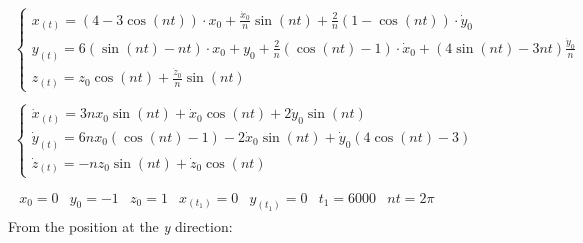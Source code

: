 \documentclass[11pt, a4paper]{article}
\begin{document}
\begin{equation}
    \begin{matrix}
        \left\{\begin{array}{l}
            \displaystyle x_{(t)} = \left(4-3\cos(nt)\right)\cdot x_0 + \frac{\dot{x}_0}{n}\sin(nt)+\frac{2}{n}\left(1-\cos(nt)\right)\cdot\dot{y}_0 \\
            \displaystyle y_{(t)} = 6\left(\sin(nt)-nt\right)\cdot x_0 + y_0 + \frac{2}{n}\left(\cos(nt)-1\right)\cdot\dot{x}_0 + \left(4\sin(nt)-3nt\right)\frac{\dot{y}_0}{n} \\
            \displaystyle z_{(t)}=z_0\cos(nt)+\frac{\dot{z}_0}{n}\sin(nt)
        \end{array}\right. \\\\
        \left\{\begin{array}{l}
            \displaystyle\dot{x}_{(t)} = 3nx_0\sin(nt) + \dot{x}_0\cos(nt) +2\dot{y}_0\sin(nt) \\
            \displaystyle\dot{y}_{(t)} = 6nx_0\left(\cos(nt)-1\right) -2\dot{x}_0\sin(nt) + \dot{y}_0\left(4\cos(nt)-3\right) \\
            \dot{z}_{(t)} = -nz_0\sin(nt)+\dot{z}_0\cos(nt)
        \end{array}\right. \\\\
        \begin{matrix}
            x_0 = 0 & y_0 = -1 & z_0 = 1 & x_{(t_1)} = 0 & y_{(t_1)} = 0 & t_1 = 6000 & nt = 2\pi%
        \end{matrix}
    \end{matrix}
\end{equation}
From the position at the \emph{y} direction:
\end{document}
